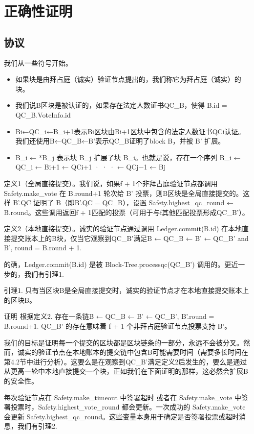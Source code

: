 \section{正确性证明}

\subsection{协议}

我们从一些符号开始。

\begin{itemize}
    \item 如果块是由拜占庭（诚实）验证节点提出的，我们称它为拜占庭（诚实）的块。
    \item 我们说B区块是被认证的，如果存在法定人数证书QC\_B，使得 B.id = QC\_B.VoteInfo.id
    \item Bi←QC\_i←B\_i+1表示Bi区块由Bi+1区块中包含的法定人数证书QCi认证。我们还使用B←QC\_B←B'表示QC\_B证明了block B，并被 B' 扩展。
    \item B\_i ← *B\_j 表示块 B\_j 扩展了块 B\_i。也就是说，存在一个序列 B\_i ← QC\_i ← Bi+1 ← QCi+1 · · · ← QCj−1 ← Bj
\end{itemize}

定义1（全局直接提交）。我们说，如果f + 1个非拜占庭验证节点都调用 Safety.make\_vote 在 B.round+1 轮次给 B' 投票，则B区块是全局直接提交的。这样 B'.QC 证明了 B（即B'.QC = QC\_B），设置 Safety.highest\_qc\_round ← B.round。这些调用返回f + 1匹配的投票（可用于与f其他匹配投票形成QC\_B'）。

定义2（本地直接提交）。诚实的验证节点通过调用 Ledger.commit(B.id) 在本地直接提交账本上的B块，仅当它观察到QC\_B'满足B ← QC\_B ← B' ← QC\_B' and B', round = B.round + 1.

的确，Ledger.commit(B.id) 是被 Block-Tree.processqc(QC\_B') 调用的。更近一步的，我们有引理1.

引理1. 只有当区块B是全局直接提交时，诚实的验证节点才在本地直接提交账本上的区块B。

证明 根据定义2. 存在一条链B ← QC\_B ← B' ← QC\_B', B'.round = B.round+1. QC\_B' 的存在意味着 f + 1 个非拜占庭验证节点投票支持 B'。

我们的目标是证明每一个提交的区块都是区块链条的一部分，永远不会被分叉。然而，诚实的验证节点在本地账本的提交链中包含B可能需要时间（需要多长时间在第4.2节中进行分析）。这要么是在观察到QC\_B'满足定义2后发生的，要么是通过从更高一轮中本地直接提交一个块，正如我们在下面证明的那样，这必然会扩展B的安全性。

每次验证节点在 Safety.make\_timeout 中签署超时 或者在 Safety.make\_vote 中签署投票时，Safety.highest\_vote\_round 都会更新。一次成功的 Safety.make\_vote 会更新 Safety.highest\_qc\_round。这些变量本身用于确定是否签署投票或超时消息，我们有引理2.


